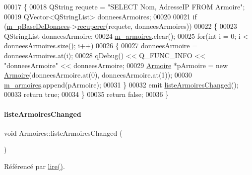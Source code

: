 \begin{DoxyCode}
00017 \{
00018     QString requete = \textcolor{stringliteral}{"SELECT Nom, AdresseIP FROM Armoire"};
00019     QVector<QStringList> donneesArmoires;
00020 
00021     \textcolor{keywordflow}{if} (\hyperlink{class_armoires_a096a57892eaad473fefc2a20fe4965bd}{m\_pBaseDeDonnees}->\hyperlink{class_base_de_donnees_a77539baad389f5acf754cd2cd452403e}{recuperer}(requete, donneesArmoires))
00022     \{
00023         QStringList donneesArmoire;
00024         \hyperlink{class_armoires_a13bc03c96ba9e069bc377f6ea10472ba}{m\_armoires}.clear();
00025         \textcolor{keywordflow}{for}(\textcolor{keywordtype}{int} i = 0; i < donneesArmoires.size(); i++)
00026         \{
00027             donneesArmoire = donneesArmoires.at(i);
00028             qDebug() << Q\_FUNC\_INFO << \textcolor{stringliteral}{"donneesArmoire"} << donneesArmoire;
00029             \hyperlink{class_armoire}{Armoire} *pArmoire = \textcolor{keyword}{new} \hyperlink{class_armoire}{Armoire}(donneesArmoire.at(0), donneesArmoire.at(1));
00030             \hyperlink{class_armoires_a13bc03c96ba9e069bc377f6ea10472ba}{m\_armoires}.append(pArmoire);
00031         \}
00032         emit \hyperlink{class_armoires_a5d1b239d24b608ce8f41677d0fbe3507}{listeArmoiresChanged}();
00033         \textcolor{keywordflow}{return} \textcolor{keyword}{true};
00034     \}
00035     \textcolor{keywordflow}{return} \textcolor{keyword}{false};
00036 \}
\end{DoxyCode}
\mbox{\label{class_armoires_a5d1b239d24b608ce8f41677d0fbe3507}} 
\paragraph{\texorpdfstring{liste\+Armoires\+Changed}{listeArmoiresChanged}}
{\footnotesize\ttfamily void Armoires\+::liste\+Armoires\+Changed (\begin{DoxyParamCaption}{ }\end{DoxyParamCaption})\hspace{0.3cm}{\ttfamily [signal]}}



Référencé par \hyperlink{class_armoires_a2b64b3df08cf848d06b4ffb6a49ae858}{lire()}.

\mbox{\label{class_armoires_aa8cb545cec5ebf4603dff93e87662cc9}} 
